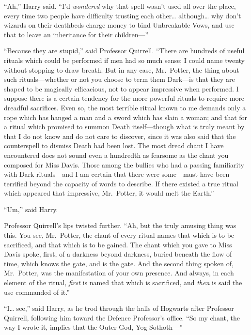``Ah,'' Harry said. ``I'd \emph{wondered} why that spell wasn't used all
over the place, every time two people have difficulty trusting each
other\ldots{} although\ldots{} why don't wizards on their deathbeds
charge money to bind Unbreakable Vows, and use that to leave an
inheritance for their children---''

``Because they are stupid,'' said Professor Quirrell. ``There are
hundreds of useful rituals which could be performed if men had so much
sense; I could name twenty without stopping to draw breath. But in any
case, Mr.~Potter, the thing about such rituals---whether or not you
choose to term them Dark---is that they are shaped to be magically
efficacious, not to appear impressive when performed. I suppose there is
a certain tendency for the more powerful rituals to require more
dreadful sacrifices. Even so, the most terrible ritual known to me
demands only a rope which has hanged a man and a sword which has slain a
woman; and that for a ritual which promised to summon Death
itself---though what is truly meant by that I do not know and do not
care to discover, since it was also said that the counterspell to
dismiss Death had been lost. The most dread chant I have encountered
does not sound even a hundredth as fearsome as the chant you composed
for Miss Davis. Those among the bullies who had a passing familiarity
with Dark rituals---and I am certain that there were some---must have
been terrified beyond the capacity of words to describe. If there
existed a true ritual which appeared that impressive, Mr.~Potter, it
would melt the Earth.''

``Um,'' said Harry.

Professor Quirrell's lips twisted further. ``Ah, but the truly amusing
thing was this. You see, Mr.~Potter, the chant of every ritual names
that which is to be sacrificed, and that which is to be gained. The
chant which you gave to Miss Davis spoke, first, of a darkness beyond
darkness, buried beneath the flow of time, which knows the gate, and is
the gate. And the second thing spoken of, Mr.~Potter, was the
manifestation of your own presence. And always, in each element of the
ritual, \emph{first} is named that which is sacrificed, and \emph{then}
is said the use commanded of it.''

``I\ldots{} see,'' said Harry, as he trod through the halls of Hogwarts
after Professor Quirrell, following him toward the Defence Professor's
office. ``So my chant, the way I wrote it, implies that the Outer God,
Yog-Sothoth---''

